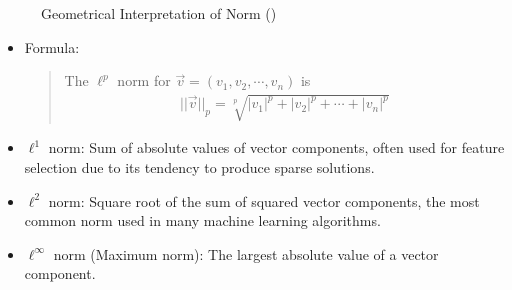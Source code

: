 \documentclass[letterpaper,11pt,english]{sphinxmanual}
\begin{document}
\begin{figure}[htbp]
\centering
\capstart

\noindent{}
\caption{Geometrical Interpretation of Norm ()}\label{\detokenize{prelim:id3}}\label{\detokenize{prelim:fig-1bauo}}\end{figure}
\begin{itemize}
\item {} 
\sphinxAtStartPar
Formula:
\begin{quote}

\sphinxAtStartPar
The \(\displaystyle \ell^p\) norm for \(\vec{v} = (v_1, v_2, \cdots, v_n)\) is
\begin{equation*}
\begin{split}||\vec{v}||_p = \sqrt[p]{|v_1|^p + |v_2|^p + \cdots +|v_n|^p }\end{split}
\end{equation*}\end{quote}

\item {} 
\sphinxAtStartPar
\(\displaystyle \ell^1\) norm: Sum of absolute values of vector components, often used for feature selection due to its tendency to produce sparse solutions.
\begin{quote}

\begin{sphinxVerbatim}[commandchars=\\\{\}]
 

\end{sphinxVerbatim}
\end{quote}

\item {} 
\sphinxAtStartPar
\(\displaystyle \ell^2\) norm: Square root of the sum of squared vector components, the most common norm used in many machine learning algorithms.
\begin{quote}

\begin{sphinxVerbatim}[commandchars=\\\{\}]

\end{sphinxVerbatim}
\end{quote}

\item {} 
\sphinxAtStartPar
\(\displaystyle \ell^\infty\) norm (Maximum norm): The largest absolute value of a vector component.

\end{itemize}
\end{document}
